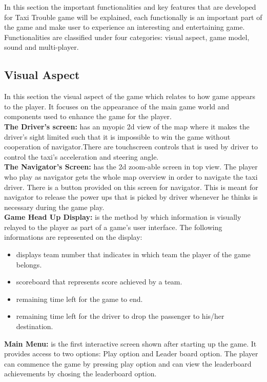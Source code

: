 In this section the important functionalities and key features that are developed for Taxi Trouble game  will be explained, each functionally is an important part of the game and make user to experience an interesting and entertaining game. Functionalities are classified under four categories: visual aspect, game model, sound and multi-player. 

\subsection*{Visual Aspect} %
\label{sub:visual_aspect}
In this section the visual aspect of the game which relates to how game appears to the player. It focuses on the appearance of the main game world and components used to enhance the game for the player. \\

\textbf{The Driver's screen:} has an myopic 2d view of the map where it makes the driver's sight limited such that it is impossible to win the game without cooperation of navigator.There are touchscreen controls that is used by driver to control the taxi's acceleration and steering angle.\\   

\textbf{The Navigator's Screen:} has the 2d zoom-able screen in top view. The player who play as navigator gets the whole map overview in order to navigate the taxi driver. There is a button provided on this screen for navigator. This is  meant for navigator to release the power ups that is picked by driver whenever he thinks is necessary during the game play.\\

\textbf{Game Head Up Display:} is the method by which information is visually relayed to the player as part of a game's user interface.  The following informations are represented on the display:
			\begin{itemize}
				\item displays team number that indicates in which team the player of the game belongs. 
				\item scoreboard that represents score achieved by a team. 
				\item remaining time left for the game to end.  
				\item remaining time left for the driver to drop the passenger to his/her destination. 
			\end{itemize}	
\textbf{ Main Menu:} is the first interactive screen shown after starting up the game. It provides access to two options: Play option and Leader board option. The player can commence the game by pressing play option and can view the leaderboard achievements by chosing the leaderboard option.\\

